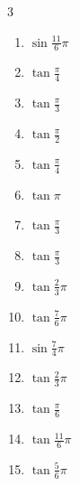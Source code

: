 \begin{multicols}{3}
\begin{enumerate}
\columnbreak %

  \item $\displaystyle \sin{\frac{11}{6}\pi}$

  \item $\displaystyle \tan{\frac{\pi}{4}}$
        \phantom{$\displaystyle =1$}

  \item $\displaystyle \tan{\frac{\pi}{3}}$

  \item $\displaystyle \tan{\frac{\pi}{2}}$
        \phantom{$\displaystyle \quad なし$}

  \item $\displaystyle \tan{\frac{\pi}{4}}$
        \phantom{$\displaystyle =1$}

  \item $\displaystyle \tan{\pi}$
        \phantom{$\displaystyle =0$}

  \item $\displaystyle \tan{\frac{\pi}{3}}$

  \item $\displaystyle \tan{\frac{\pi}{3}}$

  \item $\displaystyle \tan{\frac{2}{3}\pi}$

  \item $\displaystyle \tan{\frac{7}{6}\pi}$

  \item $\displaystyle \sin{\frac{7}{4}\pi}$

  \item $\displaystyle \tan{\frac{2}{3}\pi}$

  \item $\displaystyle \tan{\frac{\pi}{6}}$

  \item $\displaystyle \tan{\frac{11}{6}\pi}$

  \item $\displaystyle \tan{\frac{5}{6}\pi}$


\end{enumerate}
\end{multicols}
